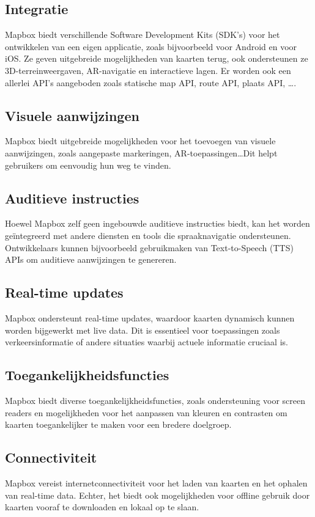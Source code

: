 \subsection*{Integratie}
Mapbox biedt verschillende Software Development Kits (SDK's) voor het ontwikkelen van een eigen applicatie, zoals bijvoorbeeld voor Android en voor iOS. Ze geven uitgebreide mogelijkheden van kaarten terug, ook ondersteunen ze 3D-terreinweergaven, AR-navigatie en interactieve lagen. Er worden ook een allerlei API's aangeboden zoals statische map API, route API, plaats API, \ldots .

\subsection*{Visuele aanwijzingen}
Mapbox biedt uitgebreide mogelijkheden voor het toevoegen van visuele aanwijzingen, zoals aangepaste markeringen, AR-toepassingen\ldots Dit helpt gebruikers om eenvoudig hun weg te vinden.

\subsection*{Auditieve instructies}
Hoewel Mapbox zelf geen ingebouwde auditieve instructies biedt, kan het worden geïntegreerd met andere diensten en tools die spraaknavigatie ondersteunen. Ontwikkelaars kunnen bijvoorbeeld gebruikmaken van Text-to-Speech (TTS) APIs om auditieve aanwijzingen te genereren.

\subsection*{Real-time updates}
Mapbox ondersteunt real-time updates, waardoor kaarten dynamisch kunnen worden bijgewerkt met live data. Dit is essentieel voor toepassingen zoals verkeersinformatie of andere situaties waarbij actuele informatie cruciaal is.

\subsection*{Toegankelijkheidsfuncties}
Mapbox biedt diverse toegankelijkheidsfuncties, zoals ondersteuning voor screen readers en mogelijkheden voor het aanpassen van kleuren en contrasten om kaarten toegankelijker te maken voor een bredere doelgroep. 

\subsection*{Connectiviteit}
Mapbox vereist internetconnectiviteit voor het laden van kaarten en het ophalen van real-time data. Echter, het biedt ook mogelijkheden voor offline gebruik door kaarten vooraf te downloaden en lokaal op te slaan.

